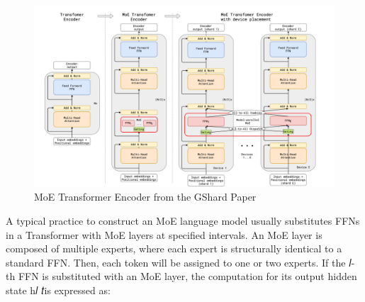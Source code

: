 \begin{figure}[t]
	\centering
	\includegraphics[scale=0.35]{./images/transformer/moe_block.png}
	\caption{MoE Transformer Encoder from the GShard Paper}
\end{figure}
A typical practice to construct an MoE language model usually substitutes FFNs in a Transformer with MoE layers at specified intervals. An MoE layer is composed of multiple experts, where each expert is structurally identical to a standard FFN. Then, each token will be assigned to one or two experts. If the 𝑙-th FFN is substituted with an MoE layer, the computation for its output hidden state h𝑙 𝑡is expressed as:


